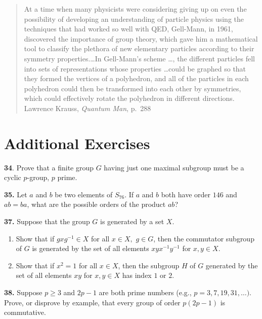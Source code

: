 \documentclass[a4paper,11pt,final,openany]{memoir}%
\theoremstyle{nonumberplain}
\begin{document}
\begin{quote}
{\small At a time when many physicists were considering giving up on even the
possibility of developing an understanding of particle physics using the
techniques that had worked so well with QED, Gell-Mann, in 1961, discovered
the importance of group theory, which gave him a mathematical tool to classify
the plethora of new elementary particles according to their symmetry
properties.\ldots In Gell-Mann's scheme \ldots, the different particles fell
into sets of representations whose properties \ldots could be graphed so that
they formed the vertices of a polyhedron, and all of the particles in each
polyhedron could then be transformed into each other by symmetries, which
could effectively rotate the polyhedron in different directions.\newline%
\hspace*{2.3in} Lawrence Krauss, \textit{Quantum Man}, p.~288 }
\end{quote}

%


\clearpage \appendix


\chapter{Additional Exercises}

\medskip\noindent\textbf{34}. Prove that a finite group $G$ having just one
maximal subgroup must be a cyclic $p$-group, $p$ prime.

\medskip\noindent\textbf{35.} Let $a$ and $b$ be two elements of $S_{76}$. If
$a$ and $b$ both have order $146$ and $ab=ba$, what are the possible orders of
the product $ab$?

\medskip\noindent\textbf{37.} Suppose that the group $G$ is generated by a set
$X$.

\begin{enumerate}
\item Show that if $gxg^{-1}\in X$ for all $x\in X,$ $g\in G$, then the
commutator subgroup of $G$ is generated by the set of all elements
$xyx^{-1}y^{-1}$ for $x,y\in X$.

\item Show that if $x^{2}=1$ for all $x\in X$, then the subgroup $H$ of $G$
generated by the set of all elements $xy$ for $x,y\in X$ has index $1$ or $2 $.
\end{enumerate}

\medskip\noindent\textbf{38.} Suppose $p\geq3$ and $2p-1$ are both prime
numbers (e.g., $p=3,7,19,31,\ldots)$. Prove, or disprove by example, that
every group of order $p(2p-1)$ is commutative.
\end{document}
